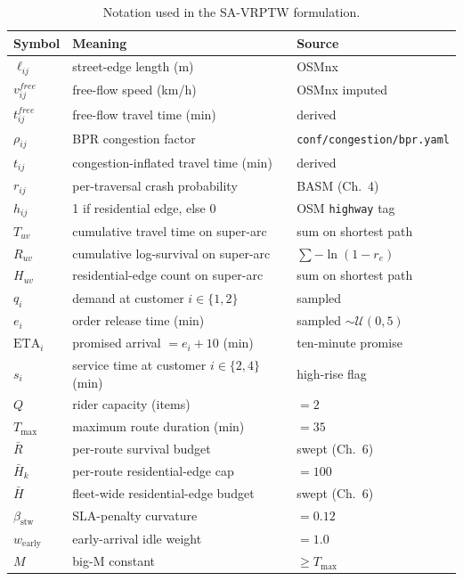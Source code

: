 \begin{table}[ht]
\centering
\caption{Notation used in the SA-VRPTW formulation.}
\label{tab:notation}
\small
\begin{tabular}{lll}
\toprule
\textbf{Symbol} & \textbf{Meaning} & \textbf{Source} \\
\midrule
$\ell_{ij}$         & street-edge length (m) & OSMnx \\
$v_{ij}^{free}$     & free-flow speed (km/h) & OSMnx imputed \\
$t_{ij}^{free}$     & free-flow travel time (min) & derived \\
$\rho_{ij}$         & BPR congestion factor & \texttt{conf/congestion/bpr.yaml} \\
$t_{ij}$            & congestion-inflated travel time (min) & derived \\
$r_{ij}$            & per-traversal crash probability & BASM (Ch.~4) \\
$h_{ij}$            & 1 if residential edge, else 0 & OSM \texttt{highway} tag \\
$T_{uv}$            & cumulative travel time on super-arc & sum on shortest path \\
$R_{uv}$            & cumulative log-survival on super-arc & $\sum -\ln(1-r_e)$ \\
$H_{uv}$            & residential-edge count on super-arc & sum on shortest path \\
$q_i$               & demand at customer $i \in \{1,2\}$ & sampled \\
$e_i$               & order release time (min) & sampled $\sim \mathcal{U}(0,5)$ \\
$\mathrm{ETA}_i$    & promised arrival $= e_i + 10$ (min) & ten-minute promise \\
$s_i$               & service time at customer $i \in \{2,4\}$ (min) & high-rise flag \\
$Q$                 & rider capacity (items) & $=2$ \\
$T_{\max}$          & maximum route duration (min) & $=35$ \\
$\bar{R}$           & per-route survival budget & swept (Ch.~6) \\
$\bar{H}_k$         & per-route residential-edge cap & $=100$ \\
$\bar{H}$           & fleet-wide residential-edge budget & swept (Ch.~6) \\
$\beta_{\text{stw}}$ & SLA-penalty curvature & $=0.12$ \\
$w_{\text{early}}$  & early-arrival idle weight & $=1.0$ \\
$M$                 & big-M constant & $\geq T_{\max}$ \\
\bottomrule
\end{tabular}
\end{table}

